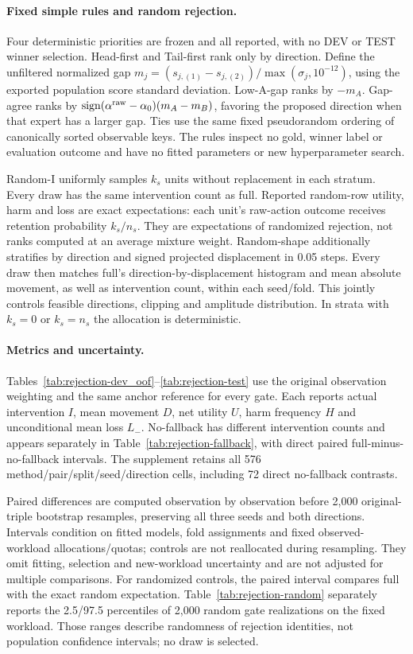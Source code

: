 \documentclass[11pt,a4paper]{article}
\begin{document}
\paragraph{Fixed simple rules and random rejection.}
Four deterministic priorities are frozen and all reported, with no DEV or TEST winner selection. Head-first and Tail-first rank only by direction. Define the unfiltered normalized gap $m_j=(s_{j,(1)}-s_{j,(2)})/\max(\sigma_j,10^{-12})$, using the exported population score standard deviation. Low-A-gap ranks by $-m_A$. Gap-agree ranks by $\operatorname{sign}(\alpha^{\rm raw}-\alpha_0)(m_A-m_B)$, favoring the proposed direction when that expert has a larger gap. Ties use the same fixed pseudorandom ordering of canonically sorted observable keys. The rules inspect no gold, winner label or evaluation outcome and have no fitted parameters or new hyperparameter search.

Random-I uniformly samples $k_s$ units without replacement in each stratum. Every draw has the same intervention count as full. Reported random-row utility, harm and loss are exact expectations: each unit's raw-action outcome receives retention probability $k_s/n_s$. They are expectations of randomized rejection, not ranks computed at an average mixture weight. Random-shape additionally stratifies by direction and signed projected displacement in 0.05 steps. Every draw then matches full's direction-by-displacement histogram and mean absolute movement, as well as intervention count, within each seed/fold. This jointly controls feasible directions, clipping and amplitude distribution. In strata with $k_s=0$ or $k_s=n_s$ the allocation is deterministic.

\paragraph{Metrics and uncertainty.}
Tables~\ref{tab:rejection-dev_oof}--\ref{tab:rejection-test} use the original observation weighting and the same anchor reference for every gate. Each reports actual intervention $I$, mean movement $D$, net utility $U$, harm frequency $H$ and unconditional mean loss $L_-$. No-fallback has different intervention counts and appears separately in Table~\ref{tab:rejection-fallback}, with direct paired full-minus-no-fallback intervals. The supplement retains all 576 method/pair/split/seed/direction cells, including 72 direct no-fallback contrasts.

Paired differences are computed observation by observation before 2,000 original-triple bootstrap resamples, preserving all three seeds and both directions. Intervals condition on fitted models, fold assignments and fixed observed-workload allocations/quotas; controls are not reallocated during resampling. They omit fitting, selection and new-workload uncertainty and are not adjusted for multiple comparisons. For randomized controls, the paired interval compares full with the exact random expectation. Table~\ref{tab:rejection-random} separately reports the 2.5/97.5 percentiles of 2,000 random gate realizations on the fixed workload. Those ranges describe randomness of rejection identities, not population confidence intervals; no draw is selected.
\end{document}
